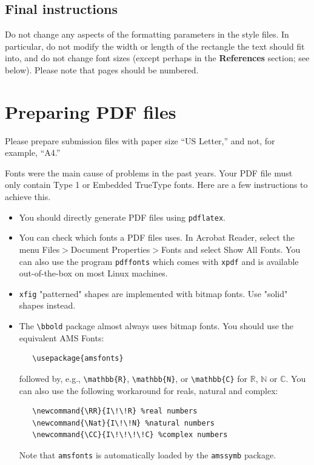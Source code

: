 \documentclass{article}
\begin{document}
\subsection{Final instructions}

Do not change any aspects of the formatting parameters in the style files.  In
particular, do not modify the width or length of the rectangle the text should
fit into, and do not change font sizes (except perhaps in the
\textbf{References} section; see below). Please note that pages should be
numbered.


\section{Preparing PDF files}


Please prepare submission files with paper size ``US Letter,'' and not, for
example, ``A4.''


Fonts were the main cause of problems in the past years. Your PDF file must only
contain Type 1 or Embedded TrueType fonts. Here are a few instructions to
achieve this.


\begin{itemize}


  \item You should directly generate PDF files using \verb+pdflatex+.


  \item You can check which fonts a PDF files uses.  In Acrobat Reader, select the
        menu Files$>$Document Properties$>$Fonts and select Show All Fonts. You can
        also use the program \verb+pdffonts+ which comes with \verb+xpdf+ and is
        available out-of-the-box on most Linux machines.


  \item \verb+xfig+ "patterned" shapes are implemented with bitmap fonts.  Use
        "solid" shapes instead.


  \item The \verb+\bbold+ package almost always uses bitmap fonts.  You should use
        the equivalent AMS Fonts:
        \begin{verbatim}
   \usepackage{amsfonts}
\end{verbatim}
        followed by, e.g., \verb+\mathbb{R}+, \verb+\mathbb{N}+, or \verb+\mathbb{C}+
        for $\mathbb{R}$, $\mathbb{N}$ or $\mathbb{C}$.  You can also use the following
        workaround for reals, natural and complex:
        \begin{verbatim}
   \newcommand{\RR}{I\!\!R} %real numbers
   \newcommand{\Nat}{I\!\!N} %natural numbers
   \newcommand{\CC}{I\!\!\!\!C} %complex numbers
\end{verbatim}
        Note that \verb+amsfonts+ is automatically loaded by the \verb+amssymb+ package.


\end{itemize}
\end{document}
